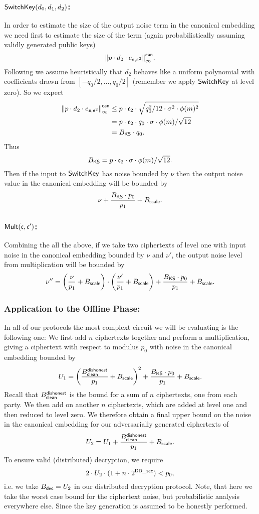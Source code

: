 \subsubsection{$\mathsf{SwitchKey}(d_0,d_1,d_2)$:}
In order to estimate the size of the output noise term
in the canonical embedding we need first to estimate the size of the term
(again probabilistically assuming validly generated public
keys)
\[ {\Vert p \cdot d_2 \cdot e_{\mathfrak{s},\mathfrak{s}^2} \Vert}_\infty^{\mathsf{can}}. \]
Following \cite{GHS12c} we assume heuristically that $d_2$
behaves like a uniform polynomial with coefficients drawn from
$[-q_0/2,\ldots,q_0/2]$ (remember we apply $\mathsf{SwitchKey}$ at level
zero).
So we expect
\begin{align*}
  {\Vert  p \cdot d_2 \cdot e_{\mathfrak{s},\mathfrak{s}^2} \Vert}_\infty^{\mathsf{can}}
   & \le p \cdot \mathfrak{c}_2 \cdot \sqrt{q_0^2/12 \cdot \sigma^2 \cdot \phi(m)^2} \\
   & = p \cdot \mathfrak{c}_2 \cdot q_0 \cdot \sigma \cdot \phi(m)/\sqrt{12}         \\
   & = B_{\mathsf{KS}} \cdot q_0.
\end{align*}
Thus
\[ B_{\mathsf{KS}} = p \cdot \mathfrak{c}_2 \cdot \sigma \cdot \phi(m)/\sqrt{12}. \]
Then if the input to $\mathsf{SwitchKey}$ has noise bounded by $\nu$ then the output
noise value in the canonical embedding will be bounded by
\[ \nu+\frac{B_{\mathsf{KS}} \cdot p_0}{p_1} + B_{\mathsf{scale}}. \]


\subsubsection{$\mathsf{Mult}(\mathfrak{c},\mathfrak{c}')$:}
Combining the all the above, if we take two ciphertexts of level one
with input noise in the canonical embedding bounded by $\nu$ and $\nu'$, the output noise level
from multiplication will be bounded by
\[ \nu'' =      \left( \frac{\nu}{p_1} + B_{\mathsf{scale}} \right)
  \cdot
  \left( \frac{\nu'}{p_1} + B_{\mathsf{scale}} \right)
  + \frac{B_{\mathsf{KS}} \cdot p_0}{p_1}+B_{\mathsf{scale}}.
\]

\subsubsection{Application to the Offline Phase:}
In all of our protocols the most complext circuit we will be evaluating
is the following one:
We first add $n$ ciphertexts together and perform a multiplication, giving a
ciphertext with respect to modulus $p_0$ with noise in the canonical
embedding bounded by
\[
  U_1 = \left( \frac{B_{\mathsf{clean}}^{\mathsf{dishonest}}}{p_1}+B_{\mathsf{scale}} \right)^2
  + \frac{B_{\mathsf{KS}} \cdot p_0}{p_1} + B_{\mathsf{scale}}.
\]
Recall that $B_{\mathsf{clean}}^{\mathsf{dishonest}}$ is the bound for a sum of
$n$ ciphertexts, one from each party.
We then add on another $n$ ciphertexts, which are added at
level one and then reduced to level zero.
We therefore obtain a final upper bound on the noise
in the canonical embedding for our adversarially generated ciphertexts of
\[ U_2 = U_1 +  \frac{B_{\mathsf{clean}}^{\mathsf{dishonest}}}{p_1} + B_{\mathsf{scale}}. \]
To ensure valid (distributed) decryption, we require
\[ 2 \cdot U_2 \cdot (1+n \cdot 2^{\mathsf{DD\_sec}}) < p_0, \]
i.e. we take $B_{\mathsf{dec}}=U_2$ in our distributed decryption protocol.
Note, that here we take the worst case bound for the ciphertext
noise, but probabilistic analysis everywhere else. Since
the key generation is assumed to be honestly performed.


